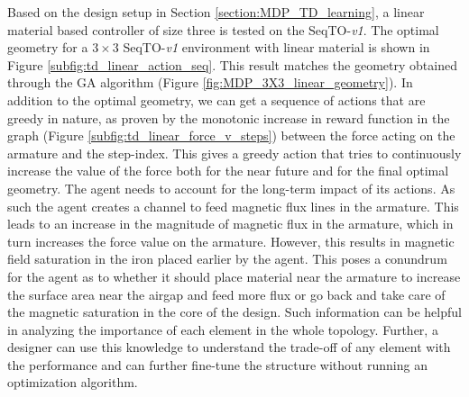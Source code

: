 Based on the design setup in Section \ref{section:MDP_TD_learning}, a linear material based controller of size three is tested on the SeqTO-\textit{v1}. 
The optimal geometry for a $3 \times 3$ SeqTO-\textit{v1} environment with linear material is shown in Figure \ref{subfig:td_linear_action_seq}. This result matches the geometry obtained through the GA algorithm (Figure \ref{fig:MDP_3X3_linear_geometry}). In addition to the optimal geometry, we can get a sequence of actions that are greedy in nature, as proven by the monotonic increase in reward function in the graph (Figure \ref{subfig:td_linear_force_v_steps}) between the force acting on the armature and the step-index. This gives a greedy action that tries to continuously increase the value of the force both for the near future and for the final optimal geometry. The agent needs to account for the long-term impact of its actions. As such the agent creates a channel to feed magnetic flux lines in the armature. This leads to an increase in the magnitude of magnetic flux in the armature, which in turn increases the force value on the armature. However, this results in magnetic field saturation in the iron placed earlier by the agent. 
This poses a conundrum for the agent as to whether it should place material near the armature to increase the surface area near the airgap and feed more flux or go back and take care of the magnetic saturation in the core of the design.
Such information can be helpful in analyzing the importance of each element in the whole topology. Further, a designer can use this knowledge to understand the trade-off of any element with the performance and can further fine-tune the structure without running an optimization algorithm.

